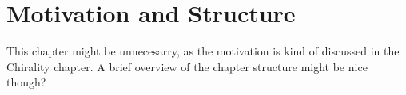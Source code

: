 \chapter{Motivation and Structure}\label{sec:background:Introduction}
\color{red}
This chapter might be unnecesarry, as the motivation is kind of discussed in the Chirality chapter. A brief overview of the chapter structure might be nice though?
\color{black}